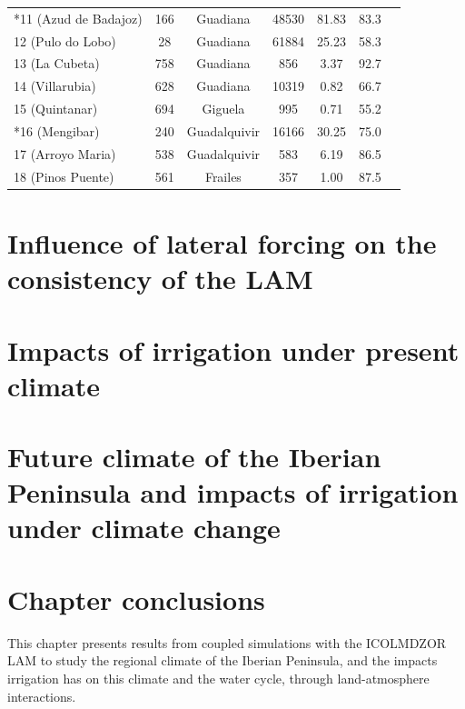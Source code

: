 \begin{table}[htbp]
{\begin{tabular}{lcccccc}
        *11 (Azud de Badajoz)   & 166   & Guadiana  & 48530     & 81.83  & 83.3 \\
        12 (Pulo do Lobo)       & 28    & Guadiana  & 61884     & 25.23  & 58.3 \\
        13 (La Cubeta)          & 758   & Guadiana  & 856       & 3.37   & 92.7 \\
        14 (Villarubia)         & 628   & Guadiana  & 10319     & 0.82   & 66.7 \\
        15 (Quintanar)          & 694   & Giguela   & 995       & 0.71   & 55.2 \\
        *16 (Mengibar)          & 240   & Guadalquivir & 16166  & 30.25  & 75.0 \\
        17 (Arroyo Maria)       & 538   & Guadalquivir & 583    & 6.19   & 86.5 \\
        18 (Pinos Puente)       & 561   & Frailes   & 357       & 1.00   & 87.5 \\
        \bottomrule
    \end{tabular}
    }
    \label{table:stations_data}
\end{table}

\clearpage

\section{Influence of lateral forcing on the consistency of the LAM}
\label{sec:forcing_influence}

\clearpage

\section{Impacts of irrigation under present climate}
\label{sec:article1}

\clearpage

\section{Future climate of the Iberian Peninsula and impacts of irrigation under climate change}
\label{sec:climate_change}

\clearpage

\section{Chapter conclusions}

This chapter presents results from coupled simulations with the ICOLMDZOR LAM to study the regional climate of the Iberian Peninsula, and the impacts irrigation has on this climate and the water cycle, through land-atmosphere interactions. 

